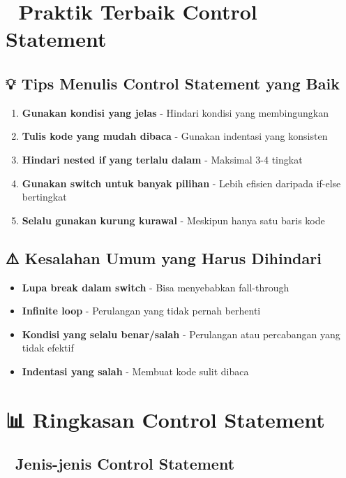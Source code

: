 \section{🎯 Praktik Terbaik Control Statement}

\subsection{💡 Tips Menulis Control Statement yang Baik}

\begin{enumerate}
\item \textbf{Gunakan kondisi yang jelas} - Hindari kondisi yang membingungkan
\item \textbf{Tulis kode yang mudah dibaca} - Gunakan indentasi yang konsisten
\item \textbf{Hindari nested if yang terlalu dalam} - Maksimal 3-4 tingkat
\item \textbf{Gunakan switch untuk banyak pilihan} - Lebih efisien daripada if-else bertingkat
\item \textbf{Selalu gunakan kurung kurawal} - Meskipun hanya satu baris kode
\end{enumerate}

\subsection{⚠️ Kesalahan Umum yang Harus Dihindari}

\begin{itemize}
\item \textbf{Lupa break dalam switch} - Bisa menyebabkan fall-through
\item \textbf{Infinite loop} - Perulangan yang tidak pernah berhenti
\item \textbf{Kondisi yang selalu benar/salah} - Perulangan atau percabangan yang tidak efektif
\item \textbf{Indentasi yang salah} - Membuat kode sulit dibaca
\end{itemize}

\section{📊 Ringkasan Control Statement}

\subsection{🔄 Jenis-jenis Control Statement}

